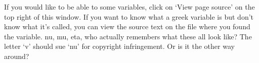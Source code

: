 \documentclass[letterpaper,10pt,english]{sphinxmanual}
\begin{document}
If you would like to be able to  some variables, click on ‘View page source’ on the top right of this window. If you want to know what a greek variable is but don’t know what it’s called, you can view the source text on the file where you found the variable. nu, mu, eta, who actually remembers what these all look like? The letter ‘v’ should sue ‘nu’ for copyright infringement. Or is it the other way around?
\begin{quote}


\begin{savenotes}\sphinxatlongtablestart{}
\end{savenotes}
\end{quote}
\end{document}
